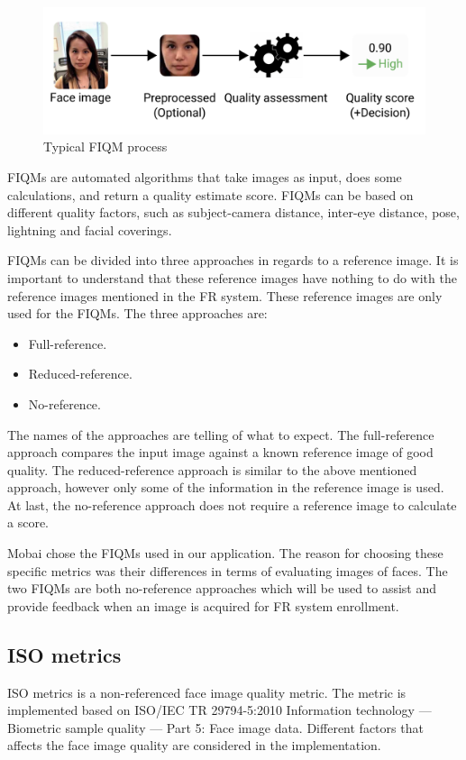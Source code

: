 \begin{figure}[h]
    \centering
    \includegraphics[scale = 0.45]{figures/FIQM.png}
    \caption{Typical FIQM process \cite{FaceImageQualityAssessment}}
    \label{fig:fiqm}
\end{figure}

FIQMs are automated algorithms that take images as input, does some calculations, and return a quality estimate score. FIQMs can be based on different quality factors, such as subject-camera distance, inter-eye distance, pose, lightning and facial coverings. 

FIQMs can be divided into three approaches in regards to a reference image. It is important to understand that these reference images have nothing to do with the reference images mentioned in the FR system. These reference images are only used for the FIQMs. The three approaches are: 

\begin{itemize}
    \item Full-reference.
    \item Reduced-reference.
    \item No-reference. 
\end{itemize}

The names of the approaches are telling of what to expect. The full-reference approach compares the input image against a known reference image of good quality. The reduced-reference approach is similar to the above mentioned approach, however only some of the information in the reference image is used. At last, the no-reference approach does not require a reference image to calculate a score. 

Mobai chose the FIQMs used in our application. The reason for choosing these specific metrics was their differences in terms of evaluating images of faces. The two FIQMs are both no-reference approaches which will be used to assist and provide feedback when an image is acquired for FR system enrollment. 


\subsection{ISO metrics}
ISO metrics is a non-referenced face image quality metric. The metric is implemented based on ISO/IEC TR 29794-5:2010 Information technology — Biometric sample quality — Part 5: Face image data. Different factors that affects the face image quality are considered in the implementation. 

